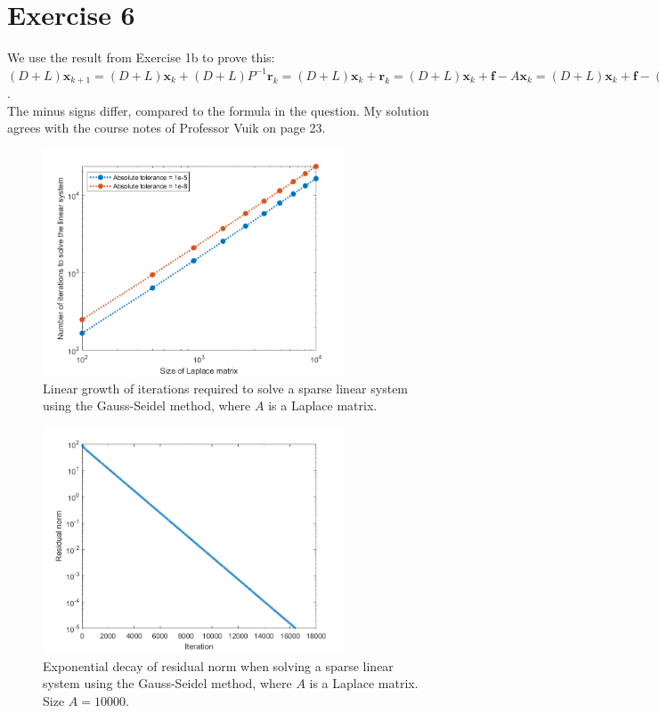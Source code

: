 \documentclass{article}
\begin{document}
\section*{Exercise 6}
We use the result from Exercise 1b to prove this:
\\
$(D+L)\bm x_{k+1} = (D+L)\bm x_k + (D+L)P^{-1}\bm r_k =  (D+L)\bm x_k + \bm r_k = (D+L)\bm x_k + \bm f - A\bm x_k = (D+L)\bm x_k + \bm f - (D + L + U)\bm x_k = -U\bm x_k + \bm f$.\\
The minus signs differ, compared to the formula in the question.
My solution agrees with the course notes of Professor Vuik on page 23.
\begin{figure}[H]
	\centering
	\includegraphics[width=0.8\textwidth]{ex5.png}
	\caption{Linear growth of iterations required to solve a sparse linear system using the Gauss-Seidel method,  where $A$ is a Laplace matrix.}
	\label{figex5}
\end{figure}
\begin{figure}[H]
	\centering
	\includegraphics[width=0.8\textwidth]{ex5_norm.png}
	\caption{Exponential decay of residual norm when solving a sparse linear system using the Gauss-Seidel method, where $A$ is a Laplace matrix. Size $A = 10000$.}
	\label{figex5norm}
\end{figure}
\pagebreak
\end{document}
